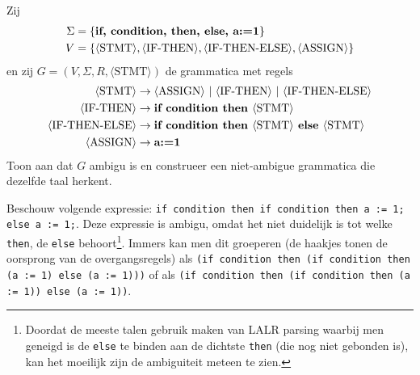 \documentclass[a4paper]{article}
\newcommand{\rul}{\rightarrow}
\newcommand{\gvar}[1]{\langle \text{{#1}} \rangle}
\newcommand{\gend}[1]{\text{\bf{#1}}}
\begin{document}
\begin{question}
Zij 
\begin{align*}
  \Sigma & = \{ \gend{if, condition, then, else, a:=1} \} \\
  V & = \{ \gvar{STMT}, \gvar{IF-THEN}, \gvar{IF-THEN-ELSE}, \gvar{ASSIGN} \} \\
\end{align*}
  en zij $G = (V,\Sigma,R,\gvar{STMT})$ de grammatica met regels
  \begin{align*}                                                                               
      \gvar{STMT}          & \rul \gvar{ASSIGN} \ | \ \gvar{IF-THEN} \ | \ \gvar{IF-THEN-ELSE}  \\
      \gvar{IF-THEN}       & \rul \gend{if condition then } \gvar{STMT} \\
      \gvar{IF-THEN-ELSE}  & \rul \gend{if condition then } \gvar{STMT} \gend{ else } \gvar{STMT} \\
      \gvar{ASSIGN}        & \rul \gend{a:=1} \\
  \end{align*}
  Toon aan dat $G$ ambigu is en construeer een niet-ambigue grammatica die dezelfde taal herkent.
\begin{answer}
Beschouw volgende expressie: \texttt{if condition then if condition then a := 1; else a := 1;}. Deze expressie is ambigu, omdat het niet duidelijk is tot welke \texttt{then}, de \texttt{else} behoort\footnote{Doordat de meeste talen gebruik maken van LALR parsing waarbij men geneigd is de \texttt{else} te binden aan de dichtste \texttt{then} (die nog niet gebonden is), kan het moeilijk zijn de ambiguiteit meteen te zien.}. Immers kan men dit groeperen (de haakjes tonen de oorsprong van de overgangsregels) als \texttt{(if condition then (if condition then (a := 1) else (a := 1)))} of als \texttt{(if condition then (if condition then (a := 1)) else (a := 1))}.
\end{answer}
\end{question}
\end{document}
